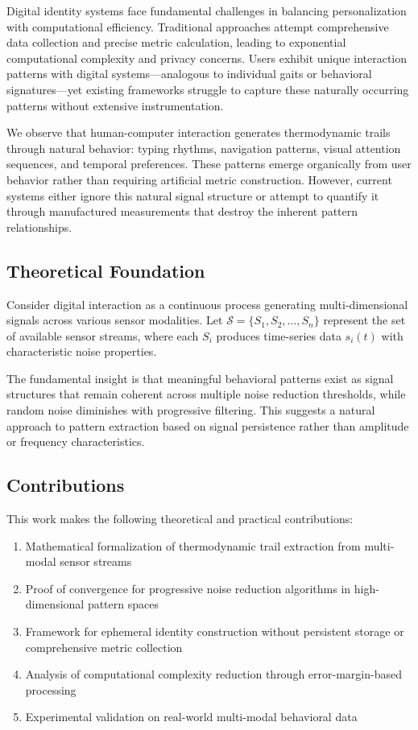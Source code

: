 \documentclass[12pt,a4paper]{article}
\begin{document}
Digital identity systems face fundamental challenges in balancing personalization with computational efficiency. Traditional approaches attempt comprehensive data collection and precise metric calculation, leading to exponential computational complexity and privacy concerns. Users exhibit unique interaction patterns with digital systems—analogous to individual gaits or behavioral signatures—yet existing frameworks struggle to capture these naturally occurring patterns without extensive instrumentation.

We observe that human-computer interaction generates thermodynamic trails through natural behavior: typing rhythms, navigation patterns, visual attention sequences, and temporal preferences. These patterns emerge organically from user behavior rather than requiring artificial metric construction. However, current systems either ignore this natural signal structure or attempt to quantify it through manufactured measurements that destroy the inherent pattern relationships.

\subsection{Theoretical Foundation}

Consider digital interaction as a continuous process generating multi-dimensional signals across various sensor modalities. Let $\mathcal{S} = \{S_1, S_2, \ldots, S_n\}$ represent the set of available sensor streams, where each $S_i$ produces time-series data $s_i(t)$ with characteristic noise properties.

The fundamental insight is that meaningful behavioral patterns exist as signal structures that remain coherent across multiple noise reduction thresholds, while random noise diminishes with progressive filtering. This suggests a natural approach to pattern extraction based on signal persistence rather than amplitude or frequency characteristics.

\subsection{Contributions}

This work makes the following theoretical and practical contributions:

\begin{enumerate}
\item Mathematical formalization of thermodynamic trail extraction from multi-modal sensor streams
\item Proof of convergence for progressive noise reduction algorithms in high-dimensional pattern spaces
\item Framework for ephemeral identity construction without persistent storage or comprehensive metric collection
\item Analysis of computational complexity reduction through error-margin-based processing
\item Experimental validation on real-world multi-modal behavioral data
\end{enumerate}
\end{document}
